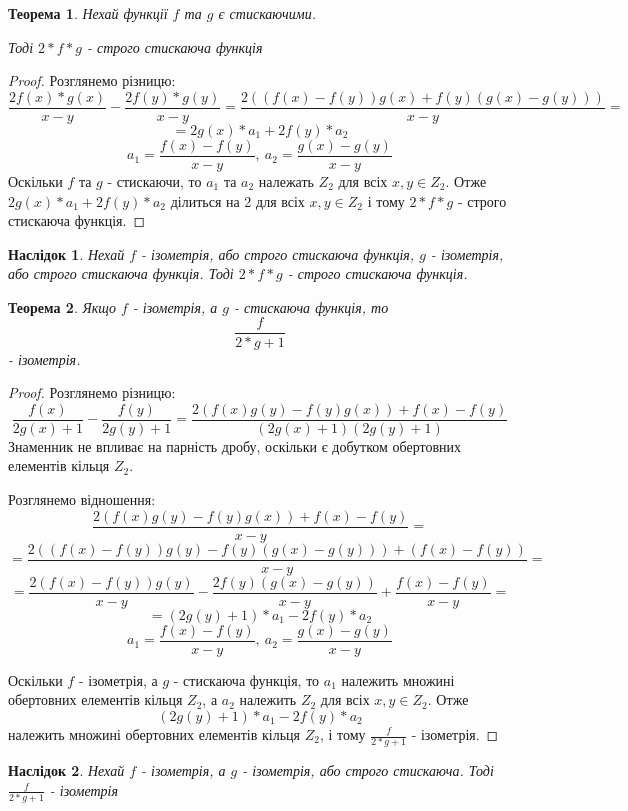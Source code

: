 \documentclass[a4paper,12pt]{article} \usepackage{a4wide}
\numberwithin{equation}{subsection}
\newtheorem{theorem}{Теорема}[subsection]
\newtheorem{corollary}{Наслідок}[subsection]
\begin{document}
  \begin{theorem} \label{product1} Нехай функції $f$ та $g$ є
    стискаючими.

    Тоді $2*f*g$ - строго стискаюча функція
  \end{theorem}
  \begin{proof} Розглянемо різницю:
   $$\frac{2f(x)*g(x)}{x-y} - \frac{2f(y)*g(y)}{x-y} = \frac{2((f(x)-f(y))g(x) + f(y)(g(x)-g(y)))}{x-y}= $$
$$= 2g(x)*a_1 + 2f(y)*a_2$$
$$ a_1 =  \frac{f(x)-f(y)}{x-y},\  a_2 =  \frac{g(x)- g(y)}{x-y}$$
Оскільки $f$ та $g$ - стискаючи, то $a_1$ та $a_2$ належать $Z_2$ для
всіх $x,y \in Z_2$.  Отже $2g(x)*a_1 + 2f(y)*a_2$ ділиться на 2 для
всіх $x,y \in Z_2$ і тому $2*f*g$ - строго стискаюча функція.
\end{proof}
\begin{corollary}
  Нехай $f$ - ізометрія, або строго стискаюча функція, $g$ -
  ізометрія, або строго стискаюча функція. Тоді $2*f*g$ - строго
  стискаюча функція.
\end{corollary}



\begin{theorem} \label{divide} Якщо $f$ - ізометрія, а $g$ - стискаюча
  функція, то $$\frac{f}{2*g+1}$$ - ізометрія.
\end{theorem}
\begin{proof}
  Розглянемо різницю:
$$\frac{f(x)}{2g(x)+1} - \frac{f(y)}{2g(y)+1} = \frac{2(f(x)g(y)-f(y)g(x))+f(x)-f(y)}{(2g(x)+1)(2g(y)+1)}$$
Знаменник не впливає на парність дробу, оскільки є добутком обертовних
елементів кільця $Z_2$.

Розглянемо відношення:
 $$\frac{2(f(x)g(y)-f(y)g(x))+f(x)-f(y)}{x-y} =$$ $$= \frac{2((f(x)-f(y))g(y)-f(y)(g(x)-g(y)))+(f(x)-f(y))}{x-y}= $$
$$= \frac{2(f(x)-f(y))g(y)}{x-y}-\frac{2f(y)(g(x)-g(y))}{x-y}+\frac{f(x)-f(y)}{x-y} =$$$$= (2g(y)+1)*a_1 - 2f(y)*a_2 $$
$$ a_1 =  \frac{f(x)-f(y)}{x-y},\  a_2 =  \frac{g(x)- g(y)}{x-y}$$

Оскільки $f$ - ізометрія, а $g$ - стискаюча функція, то $a_1$ належить
множині обертовних елементів кільця $Z_2$, а $a_2$ належить $Z_2$ для
всіх $x,y \in Z_2$. Отже $$(2g(y)+1)*a_1 - 2f(y)*a_2 $$ належить
множині обертовних елементів кільця $Z_2$, і тому $\frac{f}{2*g+1}$ -
ізометрія.
\end{proof}

  \begin{corollary}
    Нехай $f$ - ізометрія, а $g$ - ізометрія, або строго
    стискаюча. Тоді $\frac{f}{2*g+1}$ - ізометрія
  \end{corollary}
\end{document}
